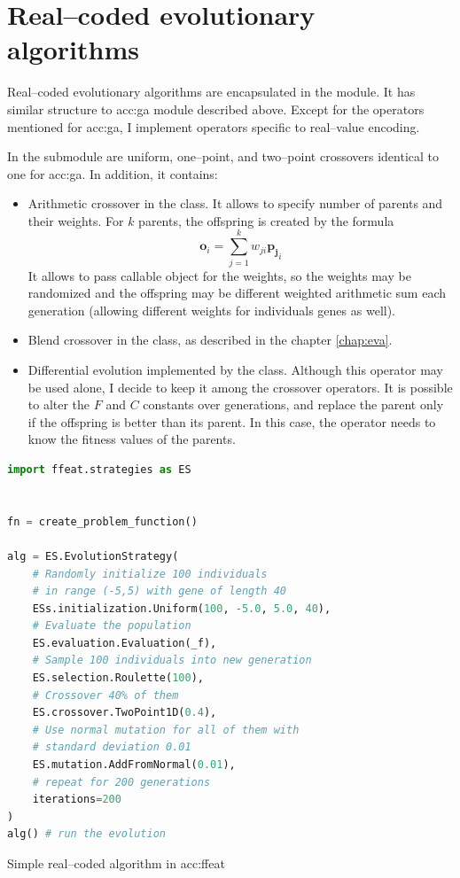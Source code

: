 \section{Real--coded evolutionary algorithms}

Real--coded evolutionary algorithms are encapsulated in the  module. It has similar structure to \acrshort{acc:ga} module described above. Except for the operators mentioned for \acrshort{acc:ga}, I implement operators specific to real--value encoding.

In the  submodule are uniform, one--point, and two--point crossovers identical to one for \acrshort{acc:ga}. In addition, it contains:
\begin{itemize}
    \item Arithmetic crossover in the  class. It allows to specify number of parents and their weights. For $k$ parents, the offspring is created by the formula 
    $$\mathbf{o}_i=\sum_{j=1}^k w_{ji}\mathbf{p_j}_i$$
    It allows to pass callable object for the weights, so the weights may be randomized and the offspring may be different weighted arithmetic sum each generation (allowing different weights for individuals genes as well).
    \item Blend crossover in the  class, as described in the chapter \ref{chap:eva}.
    \item Differential evolution implemented by the  class. Although this operator may be used alone, I decide to keep it among the crossover operators. It is possible to alter the $F$ and $C$ constants over generations, and replace the parent only if the offspring is better than its parent. In this case, the operator needs to know the fitness values of the parents.
\end{itemize}

\begin{algorithm}[b!]
\begin{lstlisting}[language=Python, xrightmargin=18pt]
import ffeat.strategies as ES


fn = create_problem_function()

alg = ES.EvolutionStrategy(
    # Randomly initialize 100 individuals 
    # in range (-5,5) with gene of length 40
    ESs.initialization.Uniform(100, -5.0, 5.0, 40),
    # Evaluate the population
    ES.evaluation.Evaluation(_f),
    # Sample 100 individuals into new generation
    ES.selection.Roulette(100),
    # Crossover 40% of them
    ES.crossover.TwoPoint1D(0.4),
    # Use normal mutation for all of them with 
    # standard deviation 0.01
    ES.mutation.AddFromNormal(0.01),
    # repeat for 200 generations
    iterations=200
)
alg() # run the evolution
\end{lstlisting}
\caption{Simple real--coded algorithm in \acrshort*{acc:ffeat}}
\label{alg:esffeat}
\end{algorithm}

